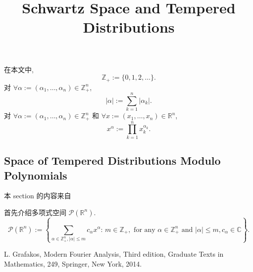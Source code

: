 \documentclass[a4paper,12pt]{article}
\title{Schwartz Space and Tempered Distributions}
\theoremstyle{definition}
\begin{document}
\begin{CJK*}{UTF8}{gbsn}

\maketitle

在本文中, 
$$ 
    \mathbb{Z}_+ := \{0, 1, 2, \ldots\}.
$$
对 $ \forall \alpha := (\alpha_1, \ldots, \alpha_n) \in \mathbb{Z}_+^n $,
$$
    |\alpha| := \sum_{k = 1}^n |\alpha_k|.
$$
对 $ \forall \alpha := (\alpha_1, \ldots, \alpha_n) \in \mathbb{Z}_+^n $ 
和 $ \forall x := (x_1, \ldots, x_n) \in \mathbb{R}^n $,
$$
    x^\alpha := \prod_{k = 1}^n x_k^{\alpha_k}.
$$ 

\subsection{Space of Tempered Distributions Modulo Polynomials}

本 section 的内容来自 \cite[1.1.1]{g14}

首先介绍多项式空间 $ \mathcal{P}(\mathbb{R}^n) $. 
$$
    \mathcal{P}(\mathbb{R}^n) 
        := \left\{ \sum_{\alpha \in \mathbb{Z}_+^n, |\alpha| \leq m} c_\alpha x^{\alpha} :\,
             m \in \mathbb{Z}_+, \text{ for any } \alpha \in \mathbb{Z}_+^n \text{ and } |\alpha| \leq m, c_\alpha \in \mathbb{C} \right\}.
$$


\begin{thebibliography}{99}
    
     L. Grafakos, Modern Fourier Analysis, Third edition, 
    Graduate Texts in Mathematics, 249, Springer, New York, 2014.
    
\end{thebibliography}

\end{CJK*}
\end{document}
